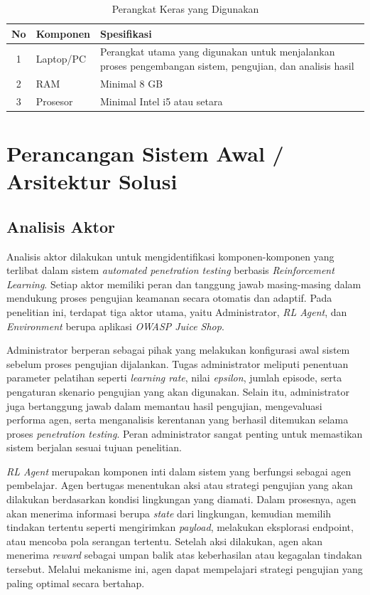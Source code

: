\begin{table}[H]
\centering
\begin{tabular}{|c|l|p{8cm}|}
\hline
\textbf{No} & \textbf{Komponen} & \textbf{Spesifikasi} \\ \hline

1 & Laptop/PC & Perangkat utama yang digunakan untuk menjalankan proses pengembangan sistem, pengujian, dan analisis hasil \\ \hline

2 & RAM & Minimal 8 GB \\ \hline

3 & Prosesor & Minimal Intel i5 atau setara \\ \hline

\end{tabular}
\caption{Perangkat Keras yang Digunakan}
\end{table}

\section{Perancangan Sistem Awal / Arsitektur Solusi}

\subsection{Analisis Aktor}

Analisis aktor dilakukan untuk mengidentifikasi komponen-komponen yang terlibat dalam sistem \textit{automated penetration testing} berbasis \textit{Reinforcement Learning}. Setiap aktor memiliki peran dan tanggung jawab masing-masing dalam mendukung proses pengujian keamanan secara otomatis dan adaptif. Pada penelitian ini, terdapat tiga aktor utama, yaitu Administrator, \textit{RL Agent}, dan \textit{Environment} berupa aplikasi \textit{OWASP Juice Shop}.

Administrator berperan sebagai pihak yang melakukan konfigurasi awal sistem sebelum proses pengujian dijalankan. Tugas administrator meliputi penentuan parameter pelatihan seperti \textit{learning rate}, nilai \textit{epsilon}, jumlah episode, serta pengaturan skenario pengujian yang akan digunakan. Selain itu, administrator juga bertanggung jawab dalam memantau hasil pengujian, mengevaluasi performa agen, serta menganalisis kerentanan yang berhasil ditemukan selama proses \textit{penetration testing}. Peran administrator sangat penting untuk memastikan sistem berjalan sesuai tujuan penelitian.

\textit{RL Agent} merupakan komponen inti dalam sistem yang berfungsi sebagai agen pembelajar. Agen bertugas menentukan aksi atau strategi pengujian yang akan dilakukan berdasarkan kondisi lingkungan yang diamati. Dalam prosesnya, agen akan menerima informasi berupa \textit{state} dari lingkungan, kemudian memilih tindakan tertentu seperti mengirimkan \textit{payload}, melakukan eksplorasi endpoint, atau mencoba pola serangan tertentu. Setelah aksi dilakukan, agen akan menerima \textit{reward} sebagai umpan balik atas keberhasilan atau kegagalan tindakan tersebut. Melalui mekanisme ini, agen dapat mempelajari strategi pengujian yang paling optimal secara bertahap.

